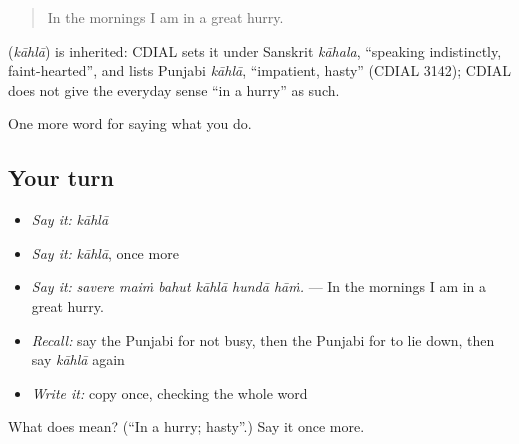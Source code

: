 \begin{quote}
In the mornings I am in a great hurry.
\end{quote}

\begin{cousinweb}
\textbf{} (\emph{kāhlā}) is inherited: CDIAL sets it under Sanskrit \emph{kāhala}, \textquotedblleft{}speaking indistinctly, faint-hearted\textquotedblright{}, and lists Punjabi \emph{kāhlā}, \textquotedblleft{}impatient, hasty\textquotedblright{} (CDIAL 3142); CDIAL does not give the everyday sense \textquotedblleft{}in a hurry\textquotedblright{} as such.
\end{cousinweb}

\begin{grammarlens}[title={What you've built}]
One more word for saying what you do.
\end{grammarlens}

\subsection*{Your turn}
\begin{itemize}
\raggedright
  \item \emph{Say it:} \emph{kāhlā}
  \item \emph{Say it:} \emph{kāhlā}, once more
  \item \emph{Say it:} \emph{savere maiṁ bahut kāhlā hundā hāṁ.} — In the mornings I am in a great hurry.
  \item \emph{Recall:} say the Punjabi for not busy, then the Punjabi for to lie down, then say \emph{kāhlā} again
  \item \emph{Write it:} copy \textbf{} once, checking the whole word
\end{itemize}

\begin{tcolorbox}[breakable,colback=teal!4,colframe=teal!35!black,title={Before you move on}]
What does  mean? (\textquotedblleft{}In a hurry; hasty\textquotedblright{}.) Say it once more.
\end{tcolorbox}
